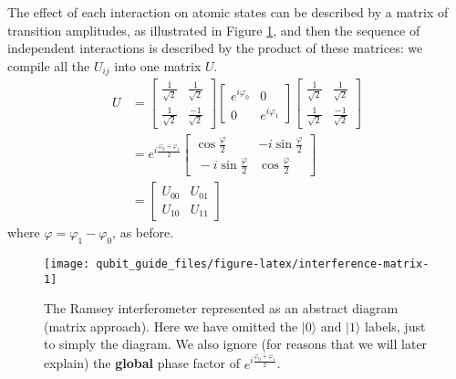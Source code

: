 \documentclass[fleqn]{article}
\begin{document}
The effect of each interaction on atomic states can be described by a matrix of transition amplitudes, as illustrated in Figure \ref{fig:interference-matrix}, and then the sequence of independent interactions is described by the product of these matrices: we compile all the \(U_{ij}\) into one matrix \(U\).
\[
  \begin{aligned}
    U &=
    \begin{bmatrix}
      \frac{1}{\sqrt{2}} & \frac{1}{\sqrt{2}}
    \\\frac{1}{\sqrt{2}} & \frac{-1}{\sqrt{2}}
    \end{bmatrix}
    \begin{bmatrix}
      e^{i\varphi_0} & 0
    \\0 & e^{i\varphi_1}
    \end{bmatrix}
    \begin{bmatrix}
      \frac{1}{\sqrt{2}} & \frac{1}{\sqrt{2}}
    \\\frac{1}{\sqrt{2}} & \frac{-1}{\sqrt{2}}
    \end{bmatrix}
  \\&= e^{i\frac{\varphi_0+\varphi_1}{2}}
    \begin{bmatrix}
      \cos\frac{\varphi}{2} & -i\sin\frac{\varphi}{2}
    \\\ -i\sin\frac{\varphi}{2}& \cos\frac{\varphi}{2}
    \end{bmatrix}
  \\&=
    \begin{bmatrix}
      U_{00} & U_{01}
    \\U_{10} & U_{11}
    \end{bmatrix}
  \end{aligned}
\]
where \(\varphi = \varphi_1-\varphi_0\), as before.



\begin{figure}[H]

{\centering \texttt{[image: qubit\_guide\_files/figure-latex/interference-matrix-1]} 

}

\caption{The Ramsey interferometer represented as an abstract diagram (matrix approach). Here we have omitted the \(|0\rangle\) and \(|1\rangle\) labels, just to simply the diagram. We also ignore (for reasons that we will later explain) the \textbf{global} phase factor of \(e^{i\frac{\varphi_0+\varphi_1}{2}}\).}\label{fig:interference-matrix}
\end{figure}
\end{document}

